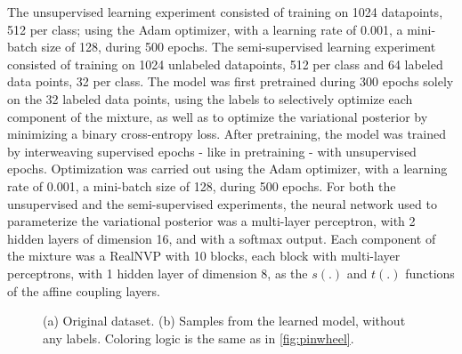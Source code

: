 The unsupervised learning experiment consisted of training on 1024 datapoints,
512 per class; using the Adam optimizer, with a learning rate
of 0.001, a mini-batch size of 128, during 500 epochs.
The semi-supervised learning experiment consisted of training on 1024 unlabeled
datapoints, 512 per class and 64 labeled data points, 32 per class. The model
was first pretrained during 300 epochs solely on the 32 labeled data points, using
the labels to selectively optimize each component of the mixture, as well as
to optimize the variational posterior by minimizing a binary cross-entropy loss.
After pretraining, the model was trained by interweaving supervised epochs - like
in pretraining - with unsupervised epochs. Optimization was carried out using the
Adam optimizer, with a learning rate of 0.001, a mini-batch size of 128, during 500 epochs.
For both the unsupervised and the semi-supervised experiments, the neural network
used to parameterize the variational posterior was a multi-layer perceptron, with
2 hidden layers of dimension 16, and with a softmax output. Each component of the
mixture was a RealNVP with 10 blocks, each block with multi-layer perceptrons,
with 1 hidden layer of dimension 8, as the $s(.)$ and $t(.)$ functions of the
affine coupling layers.

\begin{figure}[!htb]
  \begin{subfigmatrix}{2}
  \end{subfigmatrix}
    \caption{(a) Original dataset. (b) Samples from the learned model, without
    any labels. Coloring logic is the same as in \ref{fig:pinwheel}.}
\label{fig:twocircles}
\end{figure}

